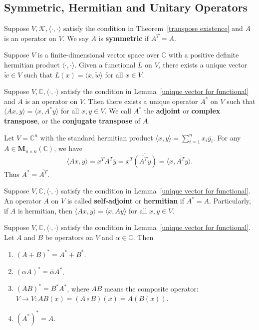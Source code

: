\documentclass{ctexart}
\newcommand{\M}{\mathbf{M}}
\newcommand{\C}{\mathbb{C}}
\begin{document}
    \subsection{Symmetric, Hermitian and Unitary Operators}
    \begin{mydef}
        Suppose $V,\mathcal{K}, \langle \cdot, \cdot \rangle$ satisfy the condition in Theorem~\ref{transpose existence} and $A$ is an operator on $V$. We say $A$ is \textbf{symmetric} if $A^T = A$.
    \end{mydef}
    \begin{mylma}\label{unique vector for functional}
        Suppose $V$ is a finite-dimensional vector space over $\C$ with a positive definite hermitian product $\langle \cdot, \cdot \rangle$. Given a functional $L$ on $V$, there exists a unique vector $\tilde{w} \in V$ such that $L(x) = \langle x, \tilde{w} \rangle$ for all $x\in V$.
    \end{mylma}
    \begin{mythm}
        Suppose $V, \C, \langle \cdot, \cdot \rangle$ satisfy the condition in Lemma~\ref{unique vector for functional} and $A$ is an operator on $V$. Then there exists a unique operator $A^*$ on $V$ such that $\langle A x, y \rangle = \langle x, A^* y \rangle$ for all $x,y \in V$. We call $A^*$ the \textbf{adjoint} or \textbf{complex transpose}, or the \textbf{conjugate transpose} of $A$.
    \end{mythm}
    \begin{myex}
        Let $V = \C^n$ with the standard hermitian product $\langle x, y \rangle = \displaystyle \sum_{i=1}^n x_i \overline{y_i}$. For any $A \in \M_{n \times n}(\C)$, we have $$\langle A x, y \rangle = x^T A^T \overline{y} = x^T \overline{ \left( \overline{A^T} y \right) } = \langle x, \overline{A^T} y \rangle.$$ Thus $A^* = \overline{A^T}$.
    \end{myex}
    \begin{mydef}
        Suppose $V, \C, \langle \cdot, \cdot \rangle$ satisfy the condition in Lemma~\ref{unique vector for functional}. An operator $A$ on $V$ is called \textbf{self-adjoint} or \textbf{hermitian} if $A^* = A$. Particularly, if $A$ is hermitian, then $\langle A x, y \rangle = \langle x, A y \rangle$ for all $x,y \in V$.
    \end{mydef}
    \begin{mythm}
        Suppose $V, \C, \langle \cdot, \cdot \rangle$ satisfy the condition in Lemma~\ref{unique vector for functional}. Let $A$ and $B$ be operators on $V$ and $\alpha \in \C$. Then
        \begin{enumerate}
            \item $(A+B)^* = A^* + B^*$.
            \item $(\alpha A)^* = \overline{\alpha} A^*$.
            \item $(AB)^* = B^* A^*$, where $AB$ means the composite operator: $V\to V: AB(x) = (A\circ B)(x) = A(B(x))$.
            \item $(A^*)^* = A$.
        \end{enumerate}
    \end{mythm}
\end{document}
